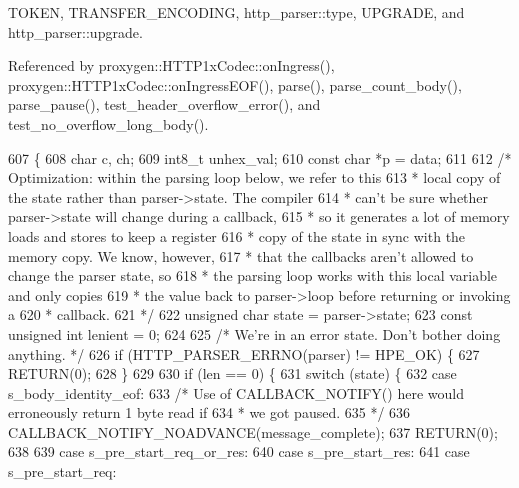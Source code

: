 T\+O\+K\+EN, T\+R\+A\+N\+S\+F\+E\+R\+\_\+\+E\+N\+C\+O\+D\+I\+NG, http\+\_\+parser\+::type, U\+P\+G\+R\+A\+DE, and http\+\_\+parser\+::upgrade.



Referenced by proxygen\+::\+H\+T\+T\+P1x\+Codec\+::on\+Ingress(), proxygen\+::\+H\+T\+T\+P1x\+Codec\+::on\+Ingress\+E\+O\+F(), parse(), parse\+\_\+count\+\_\+body(), parse\+\_\+pause(), test\+\_\+header\+\_\+overflow\+\_\+error(), and test\+\_\+no\+\_\+overflow\+\_\+long\+\_\+body().


\begin{DoxyCode}
607 \{
608   \textcolor{keywordtype}{char} c, ch;
609   int8\_t unhex\_val;
610   \textcolor{keyword}{const} \textcolor{keywordtype}{char} *p = data;
611 
612   \textcolor{comment}{/* Optimization: within the parsing loop below, we refer to this}
613 \textcolor{comment}{   * local copy of the state rather than parser->state.  The compiler}
614 \textcolor{comment}{   * can't be sure whether parser->state will change during a callback,}
615 \textcolor{comment}{   * so it generates a lot of memory loads and stores to keep a register}
616 \textcolor{comment}{   * copy of the state in sync with the memory copy.  We know, however,}
617 \textcolor{comment}{   * that the callbacks aren't allowed to change the parser state, so}
618 \textcolor{comment}{   * the parsing loop works with this local variable and only copies}
619 \textcolor{comment}{   * the value back to parser->loop before returning or invoking a}
620 \textcolor{comment}{   * callback.}
621 \textcolor{comment}{   */}
622   \textcolor{keywordtype}{unsigned} \textcolor{keywordtype}{char} state = parser->state;
623   \textcolor{keyword}{const} \textcolor{keywordtype}{unsigned} \textcolor{keywordtype}{int} lenient = 0;
624 
625   \textcolor{comment}{/* We're in an error state. Don't bother doing anything. */}
626   \textcolor{keywordflow}{if} (HTTP_PARSER_ERRNO(parser) != HPE_OK) \{
627     RETURN(0);
628   \}
629 
630   \textcolor{keywordflow}{if} (len == 0) \{
631     \textcolor{keywordflow}{switch} (state) \{
632       \textcolor{keywordflow}{case} s_body_identity_eof:
633         \textcolor{comment}{/* Use of CALLBACK\_NOTIFY() here would erroneously return 1 byte read if}
634 \textcolor{comment}{         * we got paused.}
635 \textcolor{comment}{         */}
636         CALLBACK_NOTIFY_NOADVANCE(message\_complete);
637         RETURN(0);
638 
639       \textcolor{keywordflow}{case} s_pre_start_req_or_res:
640       \textcolor{keywordflow}{case} s_pre_start_res:
641       \textcolor{keywordflow}{case} s_pre_start_req:

\end{DoxyCode}
